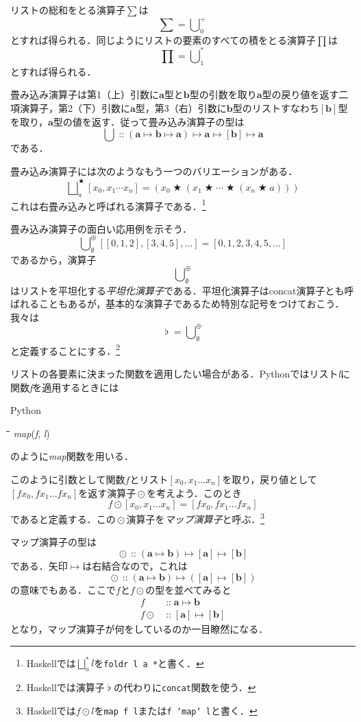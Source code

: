 \documentclass[twocolumn]{jsbook}
\newcommand{\keyword}[1]{{\emph{#1}}}
\newcommand{\code}[1]{\texttt{#1}}
\newenvironment{pythoncode}{\begin{itembox}[r]{Python}}{\end{itembox}}
\newenvironment{python}{\begin{tabbing}\hspace*{1em}\=\hspace*{1em}\=\hspace*{1em}\=\hspace*{1em}\=\kill}{\end{tabbing}}
\newcommand{\pthnId}[1]{\textit{#1}}
\newcommand{\hsklType}[1]{\textbf{#1}}
\DeclareMathOperator{\hsklConcat}{\flat}
\DeclareMathOperator{\hsklMap}{\odot}
\DeclareMathOperator{\hsklOf}{::}
\newcommand{\hsklAppend}{\oplus}
\newcommand{\hsklEmptyList}{\emptyset}
\newcommand{\hsklListType}[1]{[#1]}
\DeclareMathOperator{\mathAnyBinaryOperator}{\bigstar}
\DeclareMathOperator{\mathIn}{::}
\DeclareMathOperator*{\mathFold}{\bigcup}
\DeclareMathOperator*{\mathFoldRight}{\bigsqcup}
\DeclareMathOperator{\mathMapsTo}{\mapsto}
\newcommand{\mathMorph}[2]{#1\mathMapsTo#2}
\newcommand{\mathMorphII}[3]{#1\mathMapsTo#2\mathMapsTo#3}
\newcommand{\mathMorphIII}[4]{#1\mathMapsTo#2\mathMapsTo#3\mathMapsTo#4}
\begin{document}
リストの総和をとる演算子$\sum$は$$\sum=\mathFold^+_0$$とすれば得られる．同じようにリストの要素のすべての積をとる演算子$\prod$は$$\prod=\mathFold^*_1$$とすれば得られる．

畳み込み演算子は第1（上）引数に$\hsklType{a}$型と$\hsklType{b}$型の引数を取り$\hsklType{a}$型の戻り値を返す二項演算子，第2（下）引数に$\hsklType{a}$型，第3（右）引数に$\hsklType{b}$型のリストすなわち$\hsklListType{\hsklType{b}}$型を取り，$\hsklType{a}$型の値を返す．従って畳み込み演算子の型は$$\mathFold\mathIn\mathMorphIII{(\mathMorphII{\hsklType{a}}{\hsklType{b}}{\hsklType{a}})}{\hsklType{a}}{\hsklListType{\hsklType{b}}}{\hsklType{a}}$$である．

畳み込み演算子には次のようなもう一つのバリエーションがある．$$\mathFoldRight^{\mathAnyBinaryOperator}_{a}[x_0,x_1\dotsb x_n]=\left(x_0\mathAnyBinaryOperator\left(x_1\mathAnyBinaryOperator\dotsb\mathAnyBinaryOperator\left(x_n\mathAnyBinaryOperator a\right)\right)\right)$$
これは右畳み込みと呼ばれる演算子である．\footnote{Haskellでは$\mathFoldRight^{*}_{a}l$を\code{foldr l a *}と書く．}

畳み込み演算子の面白い応用例を示そう．$$\mathFold_\hsklEmptyList^\hsklAppend[[0,1,2],[3,4,5],\dots]=[0,1,2,3,4,5,\dots]$$であるから，演算子$$\mathFold_\hsklEmptyList^\hsklAppend$$はリストを平坦化する\keyword{平坦化演算子}である．平坦化演算子はconcat演算子とも呼ばれることもあるが，基本的な演算子であるため特別な記号をつけておこう．我々は$$\hsklConcat=\mathFold_\hsklEmptyList^\hsklAppend$$と定義することにする．\footnote{Haskellでは演算子$\hsklConcat$の代わりに\code{concat}関数を使う．}

リストの各要素に決まった関数を適用したい場合がある．Pythonではリスト\pthnId{l}に関数\pthnId{f}を適用するときには
\begin{pythoncode}
\begin{python}
\pthnId{map}(\pthnId{f}, \pthnId{l})
\end{python}
\end{pythoncode}
のように\pthnId{map}関数を用いる．

このように引数として関数$f$とリスト$[x_0,x_1\dots x_n]$を取り，戻り値として$[fx_0,fx_1\dots fx_n]$を返す演算子$\hsklMap$を考えよう．このとき$$f\hsklMap[x_0,x_1\dots x_n]=[fx_0,fx_1\dots fx_n]$$であると定義する．この$\hsklMap$演算子を\keyword{マップ演算子}と呼ぶ．\footnote{Haskellでは$f\hsklMap l$を\code{map f l}または\code{f `map` l}と書く．}

マップ演算子の型は$$\hsklMap\hsklOf{}\mathMorphII{(\mathMorph{\hsklType{a}}{\hsklType{b}})}{\hsklListType{\hsklType{a}}}{\hsklListType{\hsklType{b}}}$$である．矢印$\mathMapsTo$は右結合なので，これは$$\hsklMap\hsklOf{}\mathMorph{(\mathMorph{\hsklType{a}}{\hsklType{b}})}{(\mathMorph{\hsklListType{\hsklType{a}}}{\hsklListType{\hsklType{b}}})}$$の意味でもある．ここで$f$と$f\hsklMap$の型を並べてみると
\begin{align*}
f&\mathIn\mathMorph{\hsklType{a}}{\hsklType{b}}\\
f\hsklMap&\mathIn\mathMorph{\hsklListType{\hsklType{a}}}{\hsklListType{\hsklType{b}}}
\end{align*}
となり，マップ演算子が何をしているのか一目瞭然になる．
\end{document}
